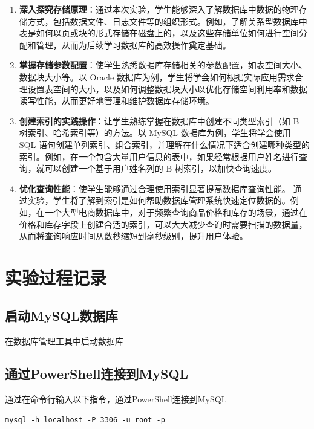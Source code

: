 \documentclass{article}
\begin{document}
	\begin{enumerate}[noitemsep, label={{\arabic*})}]
		\item \textbf{深入探究存储原理}：通过本次实验，学生能够深入了解数据库中数据的物理存储方式，包括数据文件、日志文件等的组织形式。例如，了解关系型数据库中表是如何以页或块的形式存储在磁盘上的，以及这些存储单位如何进行空间分配和管理，从而为后续学习数据库的高效操作奠定基础。
		
		\item \textbf{掌握存储参数配置}：使学生熟悉数据库存储相关的参数配置，如表空间大小、数据块大小等。以 Oracle 数据库为例，学生将学会如何根据实际应用需求合理设置表空间的大小，以及如何调整数据块大小以优化存储空间利用率和数据读写性能，从而更好地管理和维护数据库存储环境。
		
		\item \textbf{创建索引的实践操作}：让学生熟练掌握在数据库中创建不同类型索引（如 B 树索引、哈希索引等）的方法。以 MySQL 数据库为例，学生将学会使用 SQL 语句创建单列索引、组合索引，并理解在什么情况下适合创建哪种类型的索引。例如，在一个包含大量用户信息的表中，如果经常根据用户姓名进行查询，就可以创建一个基于用户姓名列的 B 树索引，以加快查询速度。
		
		\item \textbf{优化查询性能}：使学生能够通过合理使用索引显著提高数据库查询性能。 通过实验，学生将了解到索引是如何帮助数据库管理系统快速定位数据的。例如，在一个大型电商数据库中，对于频繁查询商品价格和库存的场景，通过在价格和库存字段上创建合适的索引，可以大大减少查询时需要扫描的数据量，从而将查询响应时间从数秒缩短到毫秒级别，提升用户体验。
	\end{enumerate}\textbf{}
	
	\section{实验过程记录}
	
	\subsection{启动MySQL数据库}
	
	在数据库管理工具中启动数据库
	
	\subsection{通过PowerShell连接到MySQL}
	
	通过在命令行输入以下指令，通过PowerShell连接到MySQL
	
	\begin{lstlisting}[title=通过PowerShell连接到MySQL, tabsize=4]
	mysql -h localhost -P 3306 -u root -p
	\end{lstlisting}
	
\end{document}
